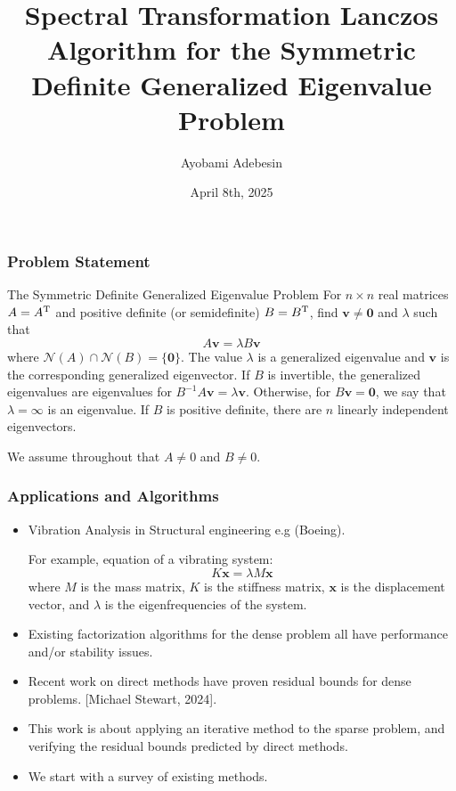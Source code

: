 \documentclass[landscape]{beamer}
\title[Spectral Transformation Lanczos Algorithm]{Spectral Transformation Lanczos Algorithm for the
  Symmetric Definite Generalized Eigenvalue Problem}
\author{Ayobami Adebesin}
\date{April 8th, 2025}
\renewcommand{\vec}[1]{\bm{#1}}
\newcommand{\T}{{\rm T}}
\newcommand{\mcal}[1]{\mathcal{#1}}
\begin{document}
\begin{frame}
  \titlepage

\end{frame}

\begin{frame}
  \frametitle{Problem Statement}

  \begin{block}{The Symmetric Definite Generalized Eigenvalue Problem}
    For $n\times n$ real matrices $A=A^\T$ and positive definite (or
    semidefinite) $B=B^\T$, find $\vec{v}\neq \vec{0}$ and $\lambda$
    such that
    \begin{equation*}
      A\vec{v} = \lambda B\vec{v}
    \end{equation*}
    where $\mcal{N}(A)\cap \mcal{N}(B)=\{\vec{0}\}$.  The value
    $\lambda$ is a generalized eigenvalue and $\vec{v}$ is the
    corresponding generalized eigenvector.  If $B$ is invertible, the
    generalized eigenvalues are eigenvalues for
    $B^{-1}A\vec{v} = \lambda \vec{v}$.  Otherwise, for
    $B\vec{v}=\vec{0}$, we say that $\lambda = \infty$ is an
    eigenvalue.  If $B$ is positive definite, there are $n$ linearly
    independent eigenvectors.
  \end{block}
  
  We assume throughout that $A\neq 0$ and $B\neq 0$.
\end{frame}

\begin{frame}
  \frametitle{Applications and Algorithms}

  \begin{itemize}
  \item Vibration Analysis in Structural engineering e.g (Boeing).
  
  For example, equation of a vibrating system:
  \begin{equation*}
  	K\mathbf{x} = \lambda M\mathbf{x}
  \end{equation*}
  where $M$ is the mass matrix, $K$ is the stiffness matrix, $\mathbf{x}$ is the displacement vector, and $\lambda$ is the eigenfrequencies of the system.
  \item Existing factorization algorithms for the dense problem all
    have performance and/or stability issues.
  \item Recent work on direct methods have proven residual bounds for dense problems. [Michael Stewart, 2024].
  \item This work is about applying an iterative method to the sparse problem, and verifying the residual bounds predicted by direct methods.
  \item We start with a survey of existing methods.
  \end{itemize}
\end{frame}
\end{document}
